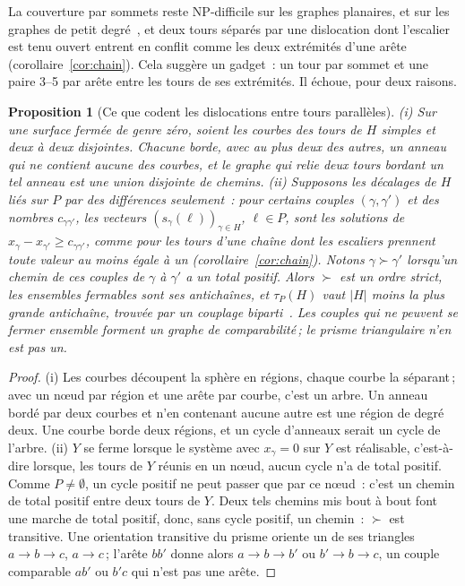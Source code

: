 \documentclass[11pt,a4paper]{article}
\newtheorem{proposition}{Proposition}
\newcommand{\shift}{s}
\newenvironment{evidence}[3][]{}{}
\begin{document}
La couverture par sommets reste NP-difficile sur les graphes planaires, et
sur les graphes de petit degré~\cite{garey1976simplified}, et deux tours
séparés par une dislocation dont l'escalier est tenu ouvert entrent en conflit
comme les deux extrémités d'une arête (corollaire~\ref{cor:chain}). Cela
suggère un gadget~: un tour par sommet et une paire 3--5 par arête entre les
tours de ses extrémités. Il échoue, pour deux raisons.

\begin{evidence}{prose}{(ii) vérifié par ordinateur sur $K_4$, le prisme triangulaire, le cube et le prisme pentagonal~: pour chaque orientation de leurs arêtes, les ensembles fermables des différences comparés aux ensembles indépendants, et les classes d'implication (\texttt{experiments/gadget.py})}
\begin{proposition}[Ce que codent les dislocations entre tours parallèles]\label{prop:differences}
(i) Sur une surface fermée de genre zéro, soient les courbes des tours de $H$
simples et deux à deux disjointes. Chacune borde, avec au plus deux des
autres, un anneau qui ne contient aucune des courbes, et le graphe qui relie deux
tours bordant un tel anneau est une union disjointe de chemins.
(ii) Supposons les décalages de $H$ liés sur $P$ par des différences
seulement~: pour certains couples $(\gamma, \gamma')$ et des nombres
$c_{\gamma\gamma'}$, les vecteurs $(\shift_\gamma(\ell))_{\gamma \in H}$,
$\ell \in P$, sont les solutions de $x_\gamma - x_{\gamma'} \ge
c_{\gamma\gamma'}$, comme pour les tours d'une chaîne dont les escaliers
prennent toute valeur au moins égale à un (corollaire~\ref{cor:chain}).
Notons $\gamma \succ \gamma'$ lorsqu'un chemin de ces couples de $\gamma$ à
$\gamma'$ a un total positif. Alors $\succ$ est un ordre strict, les ensembles
fermables sont ses antichaînes, et $\tau_P(H)$ vaut $|H|$ moins la plus grande
antichaîne, trouvée par un couplage
biparti~\cite{dilworth1950decomposition,fulkerson1956note}. Les couples qui ne
peuvent se fermer ensemble forment un graphe de comparabilité\,; le prisme
triangulaire n'en est pas un.
\end{proposition}
\end{evidence}

\begin{proof}
(i) Les courbes découpent la sphère en régions, chaque courbe la séparant\,;
avec un nœud par région et une arête par courbe, c'est un arbre. Un anneau
bordé par deux courbes et n'en contenant aucune autre est une région de degré
deux. Une courbe borde deux régions, et un cycle d'anneaux serait un cycle de
l'arbre. (ii) $Y$ se ferme lorsque le système avec $x_\gamma = 0$ sur $Y$ est
réalisable, c'est-à-dire lorsque, les tours de $Y$ réunis en un nœud, aucun
cycle n'a de total positif. Comme $P \ne \emptyset$, un cycle positif ne peut
passer que par ce nœud~: c'est un chemin de total positif entre deux tours de
$Y$. Deux tels chemins mis bout à bout font une marche de total positif, donc,
sans cycle positif, un chemin~: $\succ$ est transitive. Une orientation
transitive du prisme oriente un de ses triangles $a \to b \to c$, $a \to c$\,;
l'arête $bb'$ donne alors $a \to b \to b'$ ou $b' \to b \to c$, un couple
comparable $ab'$ ou $b'c$ qui n'est pas une arête.
\end{proof}
\end{document}
